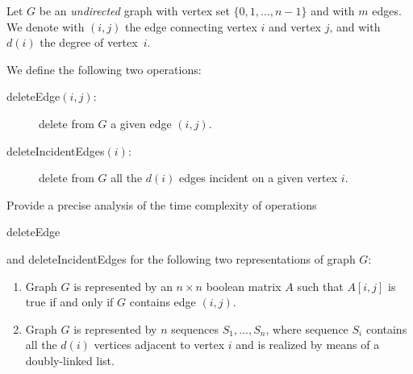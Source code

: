 Let $G$ be an {\em undirected} graph with vertex set
$\{0,1,\ldots,n-1\}$ and with $m$ edges. We denote with $(i,j)$ the
edge connecting vertex $i$ and vertex $j$, and with $d(i)$ the degree
of vertex~$i$.

We define the following two operations:
\begin{description}
\item[{\sf deleteEdge}$(i,j)$:] delete from $G$ a given edge $(i,j)$.
\item  [{\sf deleteIncidentEdges}$(i)$:] delete from $G$ all the $d(i)$
  edges incident on a given vertex $i$.
\end{description}
Provide a precise analysis of the time complexity of operations {\sf

  deleteEdge} and {\sf deleteIncidentEdges} for the following two
representations of graph $G$:
\begin{enumerate}
\item  Graph $G$ is represented by an $n \times  n$ boolean matrix $A$
  such that $A[i,j]$ is true if and only if $G$ contains edge
  $(i,j)$.
\item  Graph $G$ is represented by $n$ sequences $S_1, \ldots  , S_n$,
  where sequence $S_i$ contains all the $d(i)$ vertices adjacent to
  vertex $i$ and is realized by means of a doubly-linked list.
\end{enumerate}
